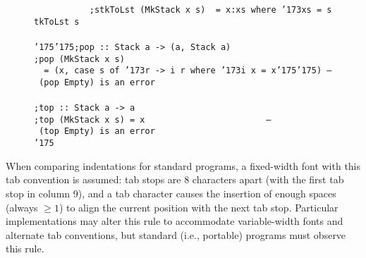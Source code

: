 \begin{figure}
{\mbox{\tt \ \ \ \ \ \ \ \ \ \ \ ;stkToLst\ (MkStack\ x\ s)\ \ =\ x:xs\ where\ {\char'173}xs\ =\ stkToLst\ s}\\
\mbox{\tt }\\[-8pt]
\mbox{\tt {\char'175}{\char'175};pop\ ::\ Stack\ a\ ->\ (a,\ Stack\ a)}\\
\mbox{\tt ;pop\ (MkStack\ x\ s)}\\
\mbox{\tt \ \ =\ (x,\ case\ s\ of\ {\char'173}r\ ->\ i\ r\ where\ {\char'173}i\ x\ =\ x{\char'175}{\char'175})\ --\ (pop\ Empty)\ is\ an\ error}\\
\mbox{\tt }\\[-8pt]
\mbox{\tt ;top\ ::\ Stack\ a\ ->\ a}\\
\mbox{\tt ;top\ (MkStack\ x\ s)\ =\ x\ \ \ \ \ \ \ \ \ \ \ \ \ \ \ \ \ \ \ \ \ \ \ \ --\ (top\ Empty)\ is\ an\ error}\\
\mbox{\tt {\char'175}}
}
\label{layout-after}

\end{figure}

When comparing indentations for standard \Haskell{} programs, a
fixed-width font with this tab convention is assumed: tab
stops are 8 characters apart (with the first tab stop in column 9),
and a tab character causes the insertion of enough spaces (always
$\geq 1$) to align the current position with the next tab stop.
Particular implementations may alter this rule to accommodate
variable-width fonts and alternate tab conventions, but standard
\Haskell{} (i.e., portable) programs must observe this rule.

